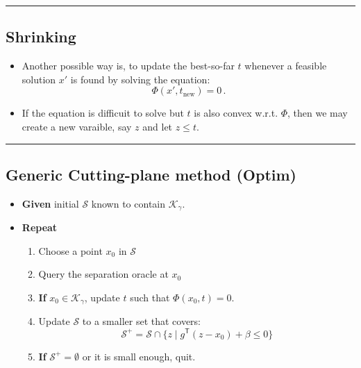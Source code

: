 \documentclass[
]{article}
\providecommand{\tightlist}{%
  \setlength{\itemsep}{0pt}\setlength{\parskip}{0pt}}
\begin{document}
\begin{center}\rule{0.5\linewidth}{0.5pt}\end{center}

\subsection{Shrinking}\label{shrinking}

\begin{itemize}
\item
  Another possible way is, to update the best-so-far \(t\) whenever a
  feasible solution \(x'\) is found by solving the equation:
  \[\Phi(x', t_\text{new}) = 0 \, .\]
\item
  If the equation is difficuit to solve but \(t\) is also convex w.r.t.
  \(\Phi\), then we may create a new varaible, say \(z\) and let
  \(z \le t\).
\end{itemize}

\begin{center}\rule{0.5\linewidth}{0.5pt}\end{center}

\subsection{Generic Cutting-plane method
(Optim)}\label{generic-cutting-plane-method-optim}

\begin{itemize}
\tightlist
\item
  \textbf{Given} initial \(\mathcal{S}\) known to contain
  \(\mathcal{K}_\gamma\).
\item
  \textbf{Repeat}

  \begin{enumerate}
  \def\labelenumi{\arabic{enumi}.}
  \tightlist
  \item
    Choose a point \(x_0\) in \(\mathcal{S}\)
  \item
    Query the separation oracle at \(x_0\)
  \item
    \textbf{If} \(x_0 \in \mathcal{K}_\gamma\), update \(t\) such that
    \(\Phi(x_0, t) = 0\).
  \item
    Update \(\mathcal{S}\) to a smaller set that covers:
    \[\mathcal{S}^+ = \mathcal{S} \cap \{z \mid g^\mathsf{T} (z - x_0) + \beta \le 0\} \]
  \item
    \textbf{If} \(\mathcal{S}^+ = \emptyset\) or it is small enough,
    quit.
  \end{enumerate}
\end{itemize}
\end{document}
